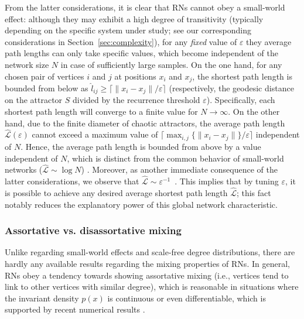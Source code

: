 From the latter considerations, it is clear that RNs cannot obey a small-world effect: although they may exhibit a high degree of transitivity (typically depending on the specific system under study; see our corresponding considerations in Section~\ref{sec:complexity}), for any \emph{fixed} value of $\varepsilon$ they average path lengths can only take specific values, which become independent of the network size $N$ in case of sufficiently large samples. On the one hand, for any chosen pair of vertices $i$ and $j$ at positions $x_i$ and $x_j$, the shortest path length is bounded from below as $\hat{l}_{ij}\geq \lceil\|x_i-x_j\|/\varepsilon\rceil$ (respectively, the geodesic distance on the attractor $S$ divided by the recurrence threshold $\varepsilon$). Specifically, each shortest path length will converge to a finite value for $N\to\infty$. On the other hand, due to the finite diameter of chaotic attractors, the average path length $\hat{\mathcal{L}}(\varepsilon)$ cannot exceed a maximum value of $\lceil\max_{i,j}\{\|x_i-x_j\|\}/\varepsilon\rceil$ independent of $N$. Hence, the average path length is bounded from above by a value independent of $N$, which is distinct from the common behavior of small-world networks ($\hat{\mathcal{L}}\sim \log N$) \cite{Watts1998}. Moreover, as another immediate consequence of the latter considerations, we observe that $\hat{\mathcal{L}}\sim\varepsilon^{-1}$~\cite{Donner2010NJP}. This implies that by tuning $\varepsilon$, it is possible to achieve any desired average shortest path length $\hat{\mathcal{L}}$; this fact notably reduces the explanatory power of this global network characteristic.



\subsubsection{Assortative vs. disassortative mixing}

Unlike regarding small-world effects and scale-free degree distributions, there are hardly any available results regarding the mixing properties of RNs. In general, RNs obey a tendency towards showing assortative mixing (i.e., vertices tend to link to other vertices with similar degree), which is reasonable in situations where the invariant density $p(x)$ is continuous or even differentiable, which is supported by recent numerical results \cite{Donges2011NPG,Donner2010NJP}. 


